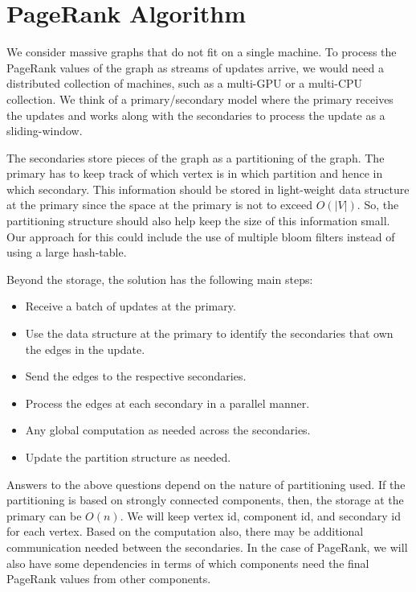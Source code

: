 \section{PageRank Algorithm}

We consider massive graphs that do not fit on a single machine. To process the PageRank values of the graph as streams of updates arrive, we would need a distributed collection of machines, such as a multi-GPU or a multi-CPU collection. We think of a primary/secondary model where the primary receives the updates and works along with the secondaries to process the update as a sliding-window.

The secondaries store pieces of the graph as a partitioning of the graph. The primary has to keep track of which vertex is in which partition and hence in which secondary. This information should be stored in light-weight data structure at the primary since the space at the primary is not to exceed $O(|V|)$. So, the partitioning structure should also help keep the size of this information small. Our approach for this could include the use of multiple bloom filters instead of using a large hash-table.

Beyond the storage, the solution has the following main steps:
\begin{itemize}[itemsep=-1.5em,topsep=0em]
\item Receive a batch of updates at the primary.
\item Use the data structure at the primary to identify the secondaries that own the edges in the update.
\item Send the edges to the respective secondaries.
\item Process the edges at each secondary in a parallel manner.
\item Any global computation as needed across the secondaries.
\item Update the partition structure as needed.
\end{itemize}

Answers to the above questions depend on the nature of partitioning used. If the partitioning is based on strongly connected components, then, the storage at the primary can be $O(n)$. We will keep vertex id, component id, and secondary id for each vertex. Based on the computation also, there may be additional communication needed between the secondaries. In the case of PageRank, we will also have some dependencies in terms of which components need the final PageRank values from other components.




